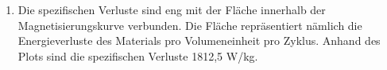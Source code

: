 \documentclass[a4paper,twoside,12pt,DIV=13,BCOR=5mm,numbers=noenddot,cleardoublepage=empty]{scrbook}
\begin{document}
\begin{enumerate}
            \\
            
            \item Die spezifischen Verluste sind eng mit der Fläche innerhalb der Magnetisierungskurve verbunden. Die Fläche repräsentiert nämlich die Energieverluste des Materials pro Volumeneinheit pro Zyklus. Anhand des Plots sind die spezifischen Verluste 1812,5 W/kg.
        
        \end{enumerate}
    
    
\end{document}
